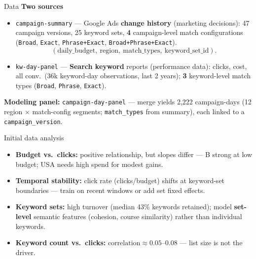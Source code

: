 \documentclass[11pt]{beamer}
\begin{document}
\begin{frame}{Data}
  \textbf{Two sources}
  \begin{itemize}
    \item \texttt{campaign-summary} --- Google Ads \textbf{change history} (marketing decisions): 47 campaign versions, 25 keyword sets, \textbf{4} campaign-level match configurations (\texttt{Broad}, \texttt{Exact}, \texttt{Phrase+Exact}, \texttt{Broad+Phrase+Exact}).
    \[
      (\text{daily\_budget},\ \text{region},\ \text{match\_types},\ \text{keyword\_set\_id}).
    \]
    \item \texttt{kw-day-panel} --- \textbf{Search keyword} reports (performance data): clicks, cost, all conv.\ (36k keyword-day observations, last 2 years); \textbf{3} keyword-level match types (\texttt{Broad}, \texttt{Phrase}, \texttt{Exact}).
  \end{itemize}
  \vspace{0.5em}
  \textbf{Modeling panel:} \texttt{campaign-day-panel} --- merge yields 2{,}222 campaign-days (12 region $\times$ match-config segments; \texttt{match\_types} from summary), each linked to a \texttt{campaign\_version}.
\end{frame}

\begin{frame}{Initial data analysis}
  \begin{itemize}
    \item \textbf{Budget vs.\ clicks:} positive relationship, but slopes differ --- B strong at low budget; USA needs high spend for modest gains.
    \item \textbf{Temporal stability:} click rate (clicks/budget) shifts at keyword-set boundaries --- train on recent windows or add set fixed effects.
    \item \textbf{Keyword sets:} high turnover (median 43\% keywords retained); model \textbf{set-level} semantic features (cohesion, course similarity) rather than individual keywords.
    \item \textbf{Keyword count vs.\ clicks:} $\text{correlation} \approx 0.05$--$0.08$ --- list size is not the driver.
  \end{itemize}
\end{frame}
\end{document}
